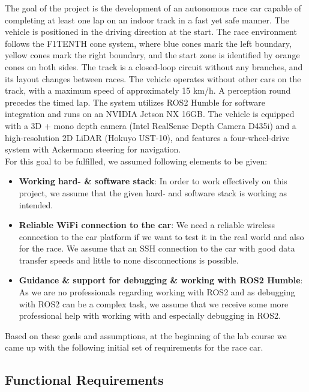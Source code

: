The goal of the project is the development of an autonomous race car capable of completing at least one lap on an indoor track in a fast yet safe manner.
The vehicle is positioned in the driving direction at the start. The race environment follows the F1TENTH cone system, where blue cones mark the left boundary, yellow cones mark the right boundary, and the start zone is identified by orange cones on both sides.
The track is a closed-loop circuit without any branches, and its layout changes between races. The vehicle operates without other cars on the track, with a maximum speed of approximately 15 km/h. 
A perception round precedes the timed lap. The system utilizes ROS2 Humble for software integration and runs on an NVIDIA Jetson NX 16GB. The vehicle is equipped with a 3D + mono depth camera (Intel RealSense Depth Camera D435i) and a high-resolution 2D LiDAR (Hokuyo UST-10), and features a four-wheel-drive system with Ackermann steering for navigation. \\
\newline
For this goal to be fulfilled, we assumed following elements to be given:
\newline
\begin{itemize}
	\item \textbf{Working hard- \& software stack}: In order to work effectively on this project, we assume that the given hard- and software stack is working as intended. 
	\item \textbf{Reliable WiFi connection to the car}: We need a reliable wireless connection to the car platform if we want to test it in the real world and also for the race. We assume that an SSH connection to the car with good data transfer speeds and little to none disconnections is possible.
	\item \textbf{Guidance \& support for debugging \& working with ROS2 Humble}: As we are no professionals regarding working with ROS2 and as debugging with ROS2 can be a complex task, we assume that we receive some more professional help with working with and especially debugging in ROS2.
\end{itemize}

Based on these goals and assumptions, at the beginning of the lab course we came up with the following initial set of requirements for the race car.

\subsection{Functional Requirements}

